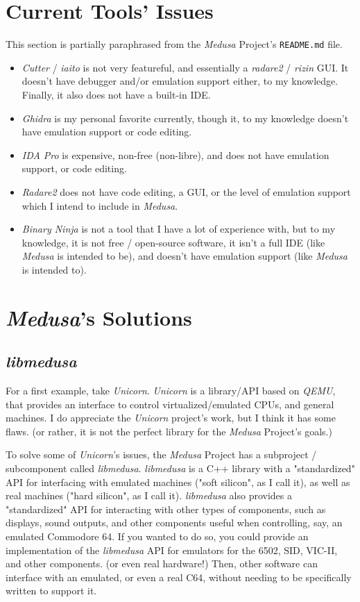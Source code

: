 \documentclass{report}
\begin{document}
	\section{Current Tools' Issues}
	This section is partially paraphrased from the \textit{Medusa} Project's
	\texttt{README.md} file.

	\begin{itemize}
		\item \textit{Cutter} / \textit{iaito} is not very featureful, and
		essentially a \textit{radare2} / \textit{rizin} GUI. It doesn't have
		debugger and/or emulation support either, to my knowledge. Finally, it
		also does not have a built-in IDE.
		\item \textit{Ghidra} is my personal favorite currently, though it, to
		my knowledge doesn't have emulation support or code editing.
		\item \textit{IDA Pro} is expensive, non-free (non-libre), and does not
		have emulation support, or code editing.
		\item \textit{Radare2} does not have code editing, a GUI, or the level
		of emulation support which I intend to include in \textit{Medusa}.
		\item \textit{Binary Ninja} is not a tool that I have a lot of
		experience with, but to my knowledge, it is not free / open-source
		software, it isn't a full IDE (like \textit{Medusa} is intended to be),
		and doesn't have emulation support (like \textit{Medusa} is intended
		to).
	\end{itemize}

	\section{\textit{Medusa}'s Solutions}
	\subsection{\textit{libmedusa}} \label{solution_libmedusa1}
	For a first example, take \textit{Unicorn}. \textit{Unicorn} is a
	library/API based on \textit{QEMU}, that provides an interface to control
	virtualized/emulated CPUs, and general machines.\cite{unicorn_github} I do
	appreciate the \textit{Unicorn} project's work, but I think it has some
	flaws. (or rather, it is not the perfect library for the \textit{Medusa}
	Project's goals.)

	To solve some of \textit{Unicorn}'s issues, the \textit{Medusa} Project has
	a subproject / subcomponent called \textit{libmedusa}. \textit{libmedusa} is
	a C++ library with a "standardized" API for interfacing with emulated
	machines ("soft silicon", as I call it), as well as real machines ("hard
	silicon", as I call it). \textit{libmedusa} also provides a "standardized"
	API for interacting with other types of components, such as displays, sound
	outputs, and other components useful when controlling, say, an emulated
	Commodore 64. If you wanted to do so, you could provide an implementation of
	the \textit{libmedusa} API for emulators for the 6502, SID, VIC-II, and
	other components. (or even real hardware!) Then, other software can
	interface with an emulated, or even a real C64, without needing to be
	specifically written to support it.
\end{document}
